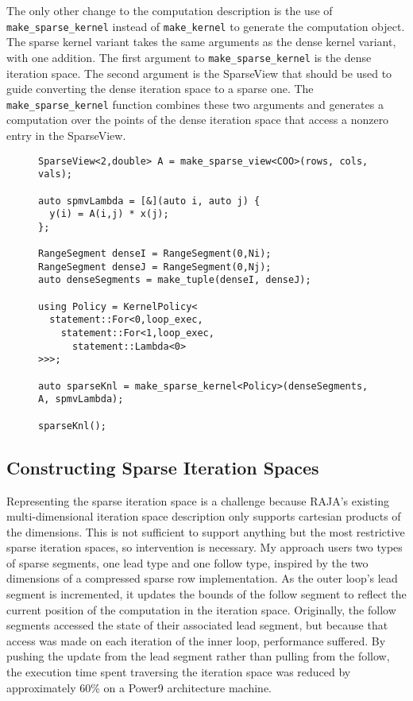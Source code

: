 The only other change to the computation description is the use of \verb.make_sparse_kernel. instead of \verb.make_kernel. to generate the computation object.
The sparse kernel variant takes the same arguments as the dense kernel variant, with one addition.
The first argument to \verb.make_sparse_kernel. is the dense iteration space.
The second argument is the SparseView that should be used to guide converting the dense iteration space to a sparse one.
The \verb.make_sparse_kernel. function combines these two arguments and generates a computation over the points of the dense iteration space that access a nonzero entry in the SparseView.

\begin{figure}
\begin{lstlisting}[caption={SpMV kernel written using the SparseRAJA prototype interface.},label=SparseRAJASpMV]
SparseView<2,double> A = make_sparse_view<COO>(rows, cols, vals);

auto spmvLambda = [&](auto i, auto j) {
  y(i) = A(i,j) * x(j);
};

RangeSegment denseI = RangeSegment(0,Ni);
RangeSegment denseJ = RangeSegment(0,Nj);
auto denseSegments = make_tuple(denseI, denseJ);

using Policy = KernelPolicy<
  statement::For<0,loop_exec,
    statement::For<1,loop_exec,
      statement::Lambda<0>
>>>;

auto sparseKnl = make_sparse_kernel<Policy>(denseSegments, A, spmvLambda);

sparseKnl();
\end{lstlisting}
\end{figure}


\subsection{Constructing Sparse Iteration Spaces}\label{sec:SparseSegments}
Representing the sparse iteration space is a challenge because RAJA's existing multi-dimensional iteration space description only supports cartesian products of the dimensions.
This is not sufficient to support anything but the most restrictive sparse iteration spaces, so intervention is necessary.
My approach users two types of sparse segments, one lead type and one follow type, inspired by the two dimensions of a compressed sparse row implementation.
As the outer loop's lead segment is incremented, it updates the bounds of the follow segment to reflect the current position of the computation in the iteration space.
Originally, the follow segments accessed the state of their associated lead segment, but because that access was made on each iteration of the inner loop, performance suffered. 
By pushing the update from the lead segment rather than pulling from the follow, the execution time spent traversing the iteration space was reduced by approximately 60\% on a Power9 architecture machine.

